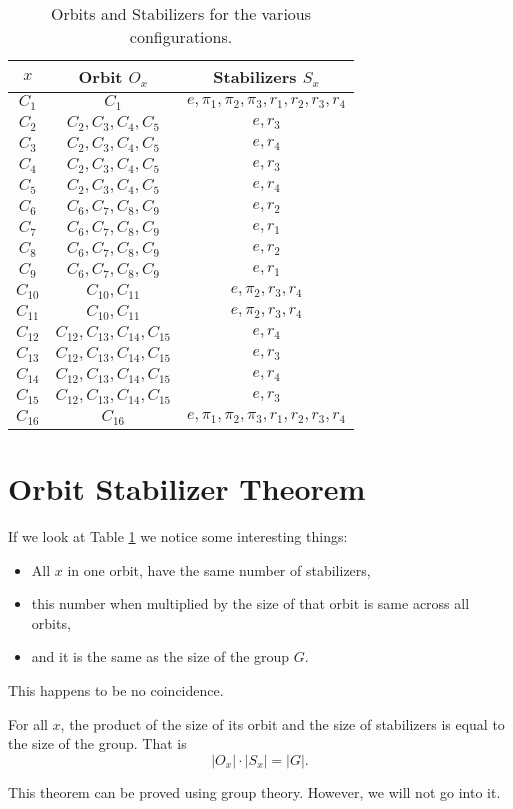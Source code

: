 \documentclass[11pt,twoside]{scrartcl}
\begin{document}
\begin{table}[h!]
    \centering
    \begin{tabular}{|c|c|c|}
        \hline
        $x$ & Orbit $O_x$ & Stabilizers $S_x$ \\
        \hline
        $C_1$ & $C_1$ & $e, \pi_1, \pi_2, \pi_3, r_1, r_2, r_3, r_4$ \\
        \hline
        $C_2$ & $C_2, C_3, C_4, C_5$ & $e, r_3$ \\
        $C_3$ & $C_2, C_3, C_4, C_5$ & $e, r_4$ \\
        $C_4$ & $C_2, C_3, C_4, C_5$ & $e, r_3$ \\
        $C_5$ & $C_2, C_3, C_4, C_5$ & $e, r_4$ \\
        \hline
        $C_6$ & $C_6, C_7, C_8, C_9$ & $e, r_2$ \\
        $C_7$ & $C_6, C_7, C_8, C_9$ & $e, r_1$ \\
        $C_8$ & $C_6, C_7, C_8, C_9$ & $e, r_2$ \\
        $C_9$ & $C_6, C_7, C_8, C_9$ & $e, r_1$ \\
        \hline
        $C_{10}$ & $C_{10}, C_{11}$ & $e, \pi_2, r_3, r_4$ \\
        $C_{11}$ & $C_{10}, C_{11}$ & $e, \pi_2, r_3, r_4$ \\
        \hline
        $C_{12}$ & $C_{12}, C_{13}, C_{14}, C_{15}$ & $e, r_4$ \\
        $C_{13}$ & $C_{12}, C_{13}, C_{14}, C_{15}$ & $e, r_3$ \\
        $C_{14}$ & $C_{12}, C_{13}, C_{14}, C_{15}$ & $e, r_4$ \\
        $C_{15}$ & $C_{12}, C_{13}, C_{14}, C_{15}$ & $e, r_3$ \\
        \hline
        $C_{16}$ & $C_{16}$ & $e, \pi_1, \pi_2, \pi_3, r_1, r_2, r_3, r_4$ \\
        \hline
    \end{tabular}
    \caption{\label{tab:square-colors-2} Orbits and Stabilizers for the various configurations.}
\end{table}
\section{Orbit Stabilizer Theorem}
If we look at Table \ref{tab:square-colors-2} we notice some interesting things:
\begin{itemize}
    \item All $x$ in one orbit, have the same number of stabilizers,
    \item this number when multiplied by the size of that orbit is same across all orbits,
    \item and it is the same as the size of the group $G$.
\end{itemize}
This happens to be no coincidence.
\begin{theorem}
    For all $x$, the product of the size of its orbit and the size of stabilizers is equal to the size of the group. That is 
    \[|O_x| \cdot |S_x| = |G|.\]
\end{theorem}
This theorem can be proved using group theory. However, we will not go into it. 
\end{document}
